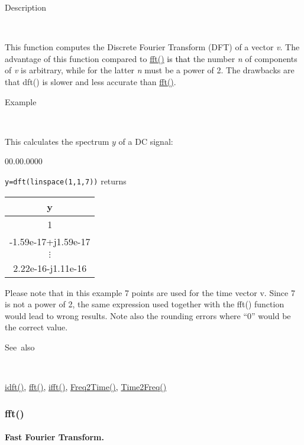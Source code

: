 \begin{description}
\item [Description]~
\end{description}

This function computes the Discrete Fourier Transform (DFT) of a
vector \textit{v}. The advantage of this function compared to
\textcolor{blue}{\hyperlink{fft}{fft()}} \textcolor{black}{is that}
the number \textit{n} of components of
\textit{v} is arbitrary, while for the latter \textit{n} must be a
power of 2. The drawbacks are that dft() is slower and less accurate
than \textcolor{blue}{\hyperlink{fft}{fft()}}.

\begin{description}
\item [Example]~
\end{description}
This calculates the spectrum $y$ of a DC signal:

\begin{lyxlist}{00.00.0000}
\item [\texttt{y=dft(linspace(1,1,7))}]returns \begin{tabular}{|c|}
\hline 
y\tabularnewline
\hline
\hline 
1\tabularnewline
\hline 
-1.59e-17+j1.59e-17\tabularnewline
\hline 
$\vdots$\tabularnewline
\hline 
2.22e-16-j1.11e-16\tabularnewline
\hline
\end{tabular}
\end{lyxlist}
Please note that in this example 7 points are used for the time vector
v. Since 7 is not a power of 2, the same expression used together with
the fft() function would lead to wrong results. Note also the rounding
errors where {}``0'' would be the correct value.

\begin{description}
\item [See~also]~
\end{description}
\textcolor{blue}{\hyperlink{idft}{idft()}}\textcolor{black}{,} \textcolor{blue}{\hyperlink{fft}{fft()}}\textcolor{black}{,}
\textcolor{blue}{\hyperlink{ifft}{ifft()}}\textcolor{black}{,}
\textcolor{blue}{\hyperlink{Freq2Time}{Freq2Time()}}\textcolor{black}{,}
\textcolor{blue}{\hyperlink{Time2Freq}{Time2Freq()}}




\newpage
\subsubsection*{\hypertarget{fft}{}{\Large fft()}}


\paragraph{\label{par:Fast-Fourier-Transform}Fast Fourier Transform.}

